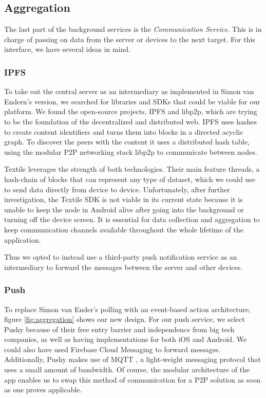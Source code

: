 \subsection{Aggregation}
The last part of the background services is the \textit{Communication Service}. This is in charge of passing on data from the server or devices to the next target. For this interface, we have several ideas in mind.
 
\subsubsection{IPFS}
To take out the central server as an intermediary as implemented in Simon van Endern's version, we searched for libraries and SDKs that could be viable for our platform. We found the open-source projects, IPFS and libp2p, which are trying to be the foundation of the decentralized and distributed web. IPFS uses hashes to create content identifiers and turns them into blocks in a directed acyclic graph. To discover the peers with the content it uses a distributed hash table, using the modular P2P networking stack libp2p to communicate between nodes.

Textile leverages the strength of both technologies. Their main feature threads, a hash-chain of blocks that can represent any type of dataset, which we could use to send data directly from device to device. Unfortunately, after further investigation, the Textile SDK is not viable in its current state because it is unable to keep the node in Android alive after going into the background or turning off the device screen. It is essential for data collection and aggregation to keep communication channels available throughout the whole lifetime of the application.

Thus we opted to instead use a third-party push notification service as an intermediary to forward the messages between the server and other devices.

\subsubsection{Push}
To replace Simon van Ender's polling with an event-based action architecture, figure \ref{fig:aggregation} shows our new design. For our push service, we select Pushy
because of their free entry barrier and independence from big tech companies, as well as having implementations for both iOS and Android. We could also have used Firebase Cloud Messaging to forward messages. Additionally, Pushy makes use of MQTT
, a light-weight messaging protocol that uses a small amount of bandwidth. Of course, the modular architecture of the app enables us to swap this method of communication for a P2P solution as soon as one proves applicable.

